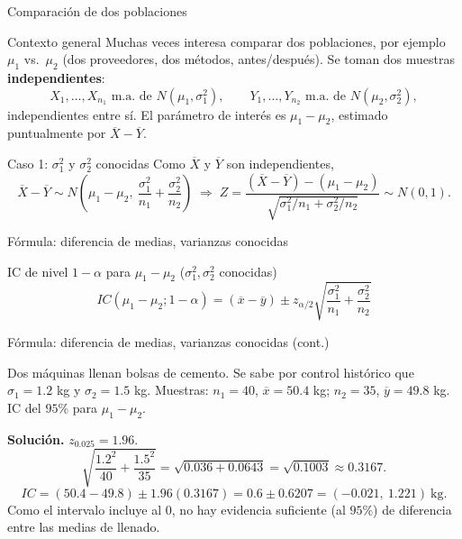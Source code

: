 \documentclass[aspectratio=169,11pt]{beamer}
\begin{document}
\begin{frame}{Comparación de dos poblaciones}
\begin{block}{Contexto general}
Muchas veces interesa comparar dos poblaciones, por ejemplo $\mu_1$ vs.\ $\mu_2$ (dos proveedores, dos métodos, antes/después). Se toman dos muestras \textbf{independientes}:
\[
X_1,\dots,X_{n_1} \text{ m.a. de } N(\mu_1,\sigma_1^2), \qquad Y_1,\dots,Y_{n_2} \text{ m.a. de } N(\mu_2,\sigma_2^2),
\]
independientes entre sí. El parámetro de interés es $\mu_1-\mu_2$, estimado puntualmente por $\overline X - \overline Y$.
\end{block}

\begin{block}{Caso 1: $\sigma_1^2$ y $\sigma_2^2$ conocidas}
Como $\overline X$ y $\overline Y$ son independientes,
\[
\overline X - \overline Y \sim N\left(\mu_1-\mu_2,\ \frac{\sigma_1^2}{n_1}+\frac{\sigma_2^2}{n_2}\right)
\;\Longrightarrow\;
Z=\frac{(\overline X-\overline Y)-(\mu_1-\mu_2)}{\sqrt{\sigma_1^2/n_1+\sigma_2^2/n_2}} \sim N(0,1).
\]
\end{block}
\end{frame}

\begin{frame}{Fórmula: diferencia de medias, varianzas conocidas}
\begin{alertblock}{IC de nivel $1-\alpha$ para $\mu_1-\mu_2$ ($\sigma_1^2,\sigma_2^2$ conocidas)}
\[
IC(\mu_1-\mu_2;1-\alpha) = (\overline x-\overline y) \pm z_{\alpha/2}\sqrt{\frac{\sigma_1^2}{n_1}+\frac{\sigma_2^2}{n_2}}
\]
\end{alertblock}

\end{frame}

\begin{frame}{Fórmula: diferencia de medias, varianzas conocidas (cont.)}
\begin{example}
Dos máquinas llenan bolsas de cemento. Se sabe por control histórico que $\sigma_1=1.2$ kg y $\sigma_2=1.5$ kg. Muestras: $n_1=40$, $\overline x=50.4$ kg; $n_2=35$, $\overline y=49.8$ kg. IC del $95\%$ para $\mu_1-\mu_2$.

\textbf{Solución.} $z_{0.025}=1.96$.
\[
\sqrt{\frac{1.2^2}{40}+\frac{1.5^2}{35}} = \sqrt{0.036 + 0.0643} = \sqrt{0.1003}\approx 0.3167.
\]
\[
IC = (50.4-49.8)\pm 1.96(0.3167) = 0.6 \pm 0.6207 = (-0.021,\ 1.221)\ \text{kg}.
\]
Como el intervalo incluye al $0$, no hay evidencia suficiente (al $95\%$) de diferencia entre las medias de llenado.
\end{example}
\end{frame}
\end{document}
